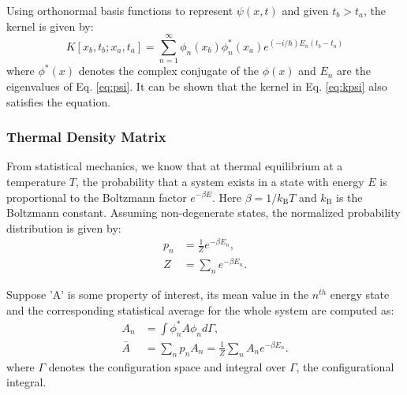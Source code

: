             Using orthonormal basis functions to represent $\psi(x,t)$ and given $t_b > t_a$, the kernel is given by:
            \begin{equation}
                \label{eq:kpsi}
                K[x_b,t_b;x_a,t_a] = \displaystyle\sum\limits_{n = 1}^\infty \phi_n(x_b){\phi^*_n(x_a)} e^{(-i/\hbar)E_n(t_b - t_a)}
            \end{equation}
            where $\phi^*(x)$ denotes the complex conjugate of the $\phi(x)$ and $E_n$ are the eigenvalues of Eq. \eqref{eq:psi}. It can be shown that the kernel in Eq. \eqref{eq:kpsi} also satisfies the \Schrodinger{} equation.

        \subsubsection{Thermal Density Matrix}
            From statistical mechanics, we know that at thermal equilibrium at a temperature $T$, the probability that a system exists in a state with energy $E$ is proportional to the Boltzmann factor $e^{-\beta E}$. Here $\beta = 1/k_\text{B} T$ and $k_\text{B}$ is the Boltzmann constant. Assuming non-degenerate states, the normalized probability distribution is given by:
            \begin{equation}
                \begin{aligned}
                    p_n &= \frac{1}{Z}e^{-\beta E_n}, \\
                    Z &= \displaystyle\sum\limits_n e^{-\beta E_n}.
                \end{aligned}
            \end{equation}
            
            Suppose 'A' is some property of interest, its mean value in the $n^{th}$ energy state and the corresponding statistical average for the whole system are computed as:
            \begin{equation}
                \begin{aligned}
                    A_n &= \displaystyle\int \phi_n^* A \phi_n d\Gamma,\\
                    \bar{A} &= \displaystyle\sum\limits_n p_n A_n = \frac{1}{Z} \displaystyle\sum\limits_n A_n e^{-\beta E_n}.
                \end{aligned}
            \end{equation}
            where $\Gamma$ denotes the configuration space and integral over $\Gamma$, the configurational integral.

